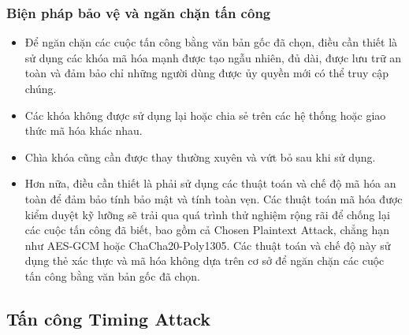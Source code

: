 \subsubsection{Biện pháp bảo vệ và ngăn chặn tấn công}
\begin{itemize}
    \item Để ngăn chặn các cuộc tấn công bằng văn bản gốc đã chọn, điều cần thiết là sử dụng các khóa mã hóa mạnh được tạo ngẫu nhiên, đủ dài, được lưu trữ an toàn và đảm bảo chỉ những người dùng được ủy quyền mới có thể truy cập chúng.
    \item Các khóa không được sử dụng lại hoặc chia sẻ trên các hệ thống hoặc giao thức mã hóa khác nhau. \item Chìa khóa cũng cần được thay thường xuyên và vứt bỏ sau khi sử dụng. 
    \item Hơn nữa, điều cần thiết là phải sử dụng các thuật toán và chế độ mã hóa an toàn để đảm bảo tính bảo mật và tính toàn vẹn. Các thuật toán mã hóa được kiểm duyệt kỹ lưỡng sẽ trải qua quá trình thử nghiệm rộng rãi để chống lại các cuộc tấn công đã biết, bao gồm cả Chosen Plaintext Attack, chẳng hạn như AES-GCM hoặc ChaCha20-Poly1305. Các thuật toán và chế độ này sử dụng thẻ xác thực và mã hóa không dựa trên cơ sở để ngăn chặn các cuộc tấn công bằng văn bản gốc đã chọn.
\end{itemize}
\subsection{Tấn công Timing Attack}
